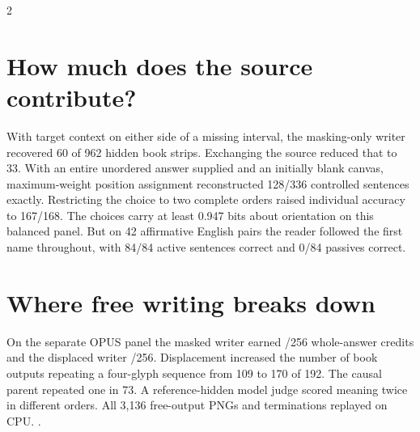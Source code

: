 \begin{multicols}{2}
\section*{How much does the source contribute?}
With target context on either side of a missing interval, the masking-only writer recovered 60 of 962 hidden book strips. Exchanging the source reduced that to 33. With an entire unordered answer supplied and an initially blank canvas, maximum-weight position assignment reconstructed 128/336 controlled sentences exactly. Restricting the choice to two complete orders raised individual accuracy to 167/168. The choices carry at least 0.947 bits about orientation on this balanced panel. But on 42 affirmative English pairs the reader followed the first name throughout, with 84/84 active sentences correct and 0/84 passives correct.
\section*{Where free writing breaks down}
On the separate OPUS panel the masked writer earned \maskOpus{}/256 whole-answer credits and the displaced writer \restoreOpus{}/256. Displacement increased the number of book outputs repeating a four-glyph sequence from 109 to 170 of 192. The causal parent repeated one in 73. A reference-hidden model judge scored meaning twice in different orders. All 3,136 free-output PNGs and terminations replayed on CPU. .
\end{multicols}
